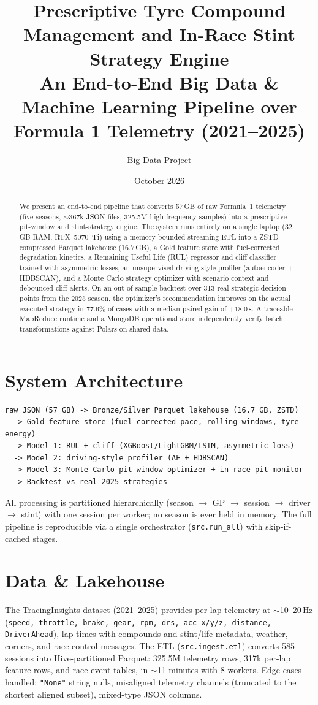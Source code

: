 \documentclass[11pt]{article}
\title{Prescriptive Tyre Compound Management and In-Race Stint Strategy Engine\\
\large An End-to-End Big Data \& Machine Learning Pipeline over Formula 1 Telemetry (2021--2025)}
\author{Big Data Project}
\date{October 2026}
\begin{document}
\maketitle

\begin{abstract}
We present an end-to-end pipeline that converts 57\,GB of raw Formula~1
telemetry (five seasons, $\sim$367k JSON files, 325.5M high-frequency samples)
into a prescriptive pit-window and stint-strategy engine. The system runs
entirely on a single laptop (32\,GB RAM, RTX~5070~Ti) using a memory-bounded
streaming ETL into a ZSTD-compressed Parquet lakehouse (16.7\,GB), a Gold
feature store with fuel-corrected degradation kinetics, a Remaining Useful
Life (RUL) regressor and cliff classifier trained with asymmetric losses, an
unsupervised driving-style profiler (autoencoder + HDBSCAN), and a Monte Carlo
strategy optimizer with scenario context and debounced cliff alerts. On an
out-of-sample backtest over 313 real strategic decision points from the 2025
season, the optimizer's recommendation improves on the actual executed
strategy in 77.6\% of cases with a median paired gain of $+18.0$\,s.
A traceable MapReduce runtime and a MongoDB operational store independently
verify batch transformations against Polars on shared data.
\end{abstract}

\section{System Architecture}
\begin{verbatim}
raw JSON (57 GB) -> Bronze/Silver Parquet lakehouse (16.7 GB, ZSTD)
  -> Gold feature store (fuel-corrected pace, rolling windows, tyre energy)
  -> Model 1: RUL + cliff (XGBoost/LightGBM/LSTM, asymmetric loss)
  -> Model 2: driving-style profiler (AE + HDBSCAN)
  -> Model 3: Monte Carlo pit-window optimizer + in-race pit monitor
  -> Backtest vs real 2025 strategies
\end{verbatim}
All processing is partitioned hierarchically
(season $\rightarrow$ GP $\rightarrow$ session $\rightarrow$ driver
$\rightarrow$ stint) with one session per worker; no season is ever held in
memory. The full pipeline is reproducible via a single orchestrator
(\texttt{src.run\_all}) with skip-if-cached stages.

\section{Data \& Lakehouse}
The TracingInsights dataset (2021--2025) provides per-lap telemetry at
$\sim$10--20\,Hz (\texttt{speed, throttle, brake, gear, rpm, drs, acc\_x/y/z,
distance, DriverAhead}), lap times with compounds and stint/life metadata,
weather, corners, and race-control messages. The ETL
(\texttt{src.ingest.etl}) converts 585 sessions into Hive-partitioned Parquet:
325.5M telemetry rows, 317k per-lap feature rows, and race-event tables, in
$\sim$11 minutes with 8 workers. Edge cases handled: \texttt{"None"} string
nulls, misaligned telemetry channels (truncated to the shortest aligned
subset), mixed-type JSON columns.
\end{document}
